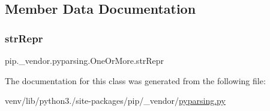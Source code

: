 \subsection{Member Data Documentation}
\mbox{\label{classpip_1_1__vendor_1_1pyparsing_1_1OneOrMore_aa07e4efeedbf25ec752ce44259343ada}} 
\subsubsection{\texorpdfstring{str\+Repr}{strRepr}}
{\footnotesize\ttfamily pip.\+\_\+vendor.\+pyparsing.\+One\+Or\+More.\+str\+Repr}



The documentation for this class was generated from the following file\+:\begin{DoxyCompactItemize}
\item 
venv/lib/python3./site-\/packages/pip/\+\_\+vendor/\hyperlink{pip_2__vendor_2pyparsing_8py}{pyparsing.\+py}\end{DoxyCompactItemize}
